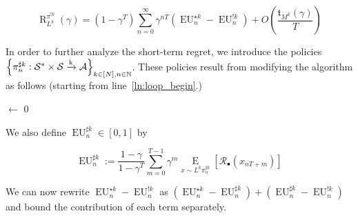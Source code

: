 \documentclass[anon,12pt]{colt2018} %
\newcommand{\AP}[1]{\left(#1\right)}
\newcommand{\AB}[1]{\left[#1\right]}
\newcommand{\AC}[1]{\left\{#1\right\}}
\newcommand{\Ea}[2]{\underset{#1}{\operatorname{E}}\AB{#2}}
\newcommand{\Nats}{\mathbb{N}}
\newcommand{\K}{\xrightarrow{\textnormal{k}}}
\newcommand{\A}{\mathcal{A}}
\newcommand{\St}{\mathcal{S}}
\newcommand{\R}{\mathcal{R}}
\newcommand{\EU}{\operatorname{EU}}
\newcommand{\Rg}{\operatorname{R}}
\newcommand{\MP}[2]{#1#2}
\newcommand{\Tn}{\mathfrak{t}}
\newcommand{\X}{\bullet}
\newcommand{\IP}{\pi^{!k}}
\begin{document}
\begin{equation}
\label{eqn:short_long_decomposition}
\Rg_{L^k}^{\IP}(\gamma) = \AP{1-\gamma^T}\sum_{n=0}^\infty \gamma^{nT}\AP{\EU^{\star k}_n-\EU^{!k}_n}+O\AP{\frac{\Tn_{M^k}(\gamma)}{T}}
\end{equation}

In order to further analyze the short-term regret, we introduce the policies\\$\AC{\pi_n^{\sharp k}: \St^* \times \St \K \A}_{k \in [N],n \in \Nats}$. These policies result from modifying the algorithm as follows (starting from line~\ref{ln:loop_begin}.)

\begin{algorithm}[h]

\setcounter{AlgoLine}{2}


\Counter$\leftarrow$ 0\;


\end{algorithm}

We also define $\EU^{\sharp k}_n\in[0,1]$ by

\begin{equation}
\label{eqn:eusharp}
\EU_n^{\sharp k}:=\frac{1-\gamma}{1-\gamma^T}\sum_{m=0}^{T-1} \gamma^m \Ea{x\sim{\MP{L^k}{\pi_n^{\sharp  k}}}}{\R_\X\AP{x_{nT+m}}}
\end{equation}

We can now rewrite $\EU^{\star k}_n-\EU^{!k}_n$ as $\AP{\EU^{\star k}_n-\EU^{\sharp k}_n}+\AP{\EU^{\sharp k}_n-\EU^{!k}_n}$ and bound the contribution of each term separately.
\end{document}
